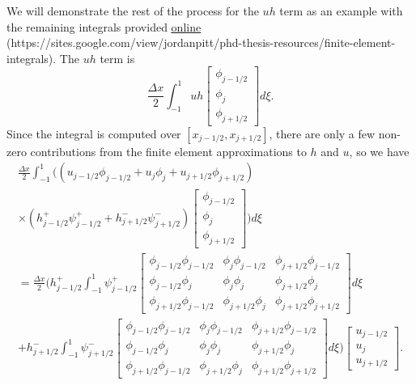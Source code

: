 We will demonstrate the rest of the process for the $uh$ term as an example with the remaining integrals provided \href{https://sites.google.com/view/jordanpitt/phd-thesis-resources/finite-element-integrals}{\color{blue}\underline{online}} (https://sites.google.com/view/jordanpitt/phd-thesis-resources/finite-element-integrals).
The $uh$ term is 
\begin{equation*}
\frac{\Delta x}{2}\int_{-1 }^{1} uh \begin{bmatrix}
\phi_{j-1/2}\\\phi_j \\\phi_{j+1/2}
\end{bmatrix} d\xi.
\end{equation*}
Since the integral is computed over $\left[x_{j-1/2},x_{j+1/2}\right]$, there are only a few non-zero contributions from the finite element approximations to $h$ and $u$, so we have
\begin{multline*}
\frac{\Delta x}{2}\int_{-1 }^{1}  \Bigg( \left(u_{j-1/2}\phi_{j-1/2} + u_{j}\phi_{j} + u_{j+1/2}\phi_{j+1/2}\right) \\ \times\left(h^+_{j-1/2}\psi^+_{j-1/2}  + h^-_{j+1/2}\psi^-_{j+1/2}\right) \begin{bmatrix}
\phi_{j-1/2}\\\phi_j \\\phi_{j+1/2}
\end{bmatrix} \Bigg) d\xi\\
=\frac{\Delta x}{2}\Bigg( h^+_{j-1/2} \int_{-1 }^{1} \psi^+_{j-1/2}  \begin{bmatrix}
\phi_{j-1/2} \phi_{j-1/2} & \phi_{j}  \phi_{j-1/2}  & \phi_{j+1/2} \phi_{j-1/2}\\\phi_{j-1/2} \phi_{j} & \phi_{j} \phi_{j} &  \phi_{j + 1/2} \phi_{j}\\\phi_{j+1/2} \phi_{j-1/2} &  \phi_{j+1/2} \phi_{j} & \phi_{j+1/2} \phi_{j+1/2}
\end{bmatrix} d\xi  \\ +  h^-_{j+1/2}\int_{-1 }^{1} \psi^-_{j+1/2} \begin{bmatrix}
\phi_{j-1/2} \phi_{j-1/2} & \phi_{j}  \phi_{j-1/2}  & \phi_{j+1/2} \phi_{j-1/2}\\\phi_{j-1/2} \phi_{j} & \phi_{j} \phi_{j} &  \phi_{j + 1/2} \phi_{j}\\\phi_{j+1/2} \phi_{j-1/2} &  \phi_{j+1/2} \phi_{j} & \phi_{j+1/2} \phi_{j+1/2}
\end{bmatrix} d\xi \Bigg)  \begin{bmatrix}
u_{j-1/2}\\u_j \\u _{j+1/2}
\end{bmatrix}.
\end{multline*}

